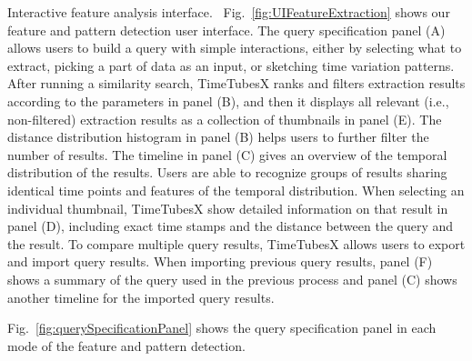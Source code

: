 \textsf{Interactive feature analysis interface.\ } 
Fig.~\ref{fig:UIFeatureExtraction} shows our feature and pattern detection user interface. 
The query specification panel (A) allows users %
to build a query with simple interactions, either by selecting what to extract, picking a part of data as an input, or sketching time variation patterns.
After running a similarity search, 
TimeTubesX ranks and filters extraction results according to the parameters in panel (B),
and then it displays all relevant (i.e., non-filtered) extraction results as a collection of thumbnails in panel (E).
The distance distribution histogram in panel (B) helps users to further filter the number of results.
The timeline in panel (C) gives an overview of the temporal distribution of the results.
Users are able to recognize groups of results sharing identical time points and features of the temporal distribution.
When selecting an individual thumbnail, TimeTubesX show detailed information on that result in panel (D), including exact time stamps and the distance between the query and the result.
To compare multiple query results,
TimeTubesX allows users to export and import query results.
When importing previous query results,
panel (F) shows a summary of the query used in the previous process and panel (C) shows another timeline for the imported query results.

Fig.~\ref{fig:querySpecificationPanel} shows the query specification panel in each mode of the feature and pattern detection.

